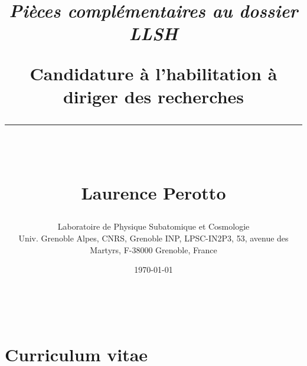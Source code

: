 \documentclass[a4paper, 11pt]{report}
\makeatletter
\renewcommand{\maketitle}{ %
\begin{flushleft} %
{\LARGE\@title} %

\vspace{50pt} %

{\large\@author} %
\\\@date %

\vspace{40pt} %
\end{flushleft}
}
\makeatother
\begin{document}
\title{\parbox{16cm}{
    \textit{Pi\`eces compl\'ementaires au dossier LLSH} \\ [5cm]   
    \begin{center}\sf\bfseries\huge
      Candidature \`a l'habilitation \`a diriger des recherches \\ [-4mm]
      \rule{16cm}{1pt}\\ [2cm]   
    \end{center}
    \begin{center} 
      \sf \bfseries {\textcolor{bleu}{Laurence Perotto}} \\ [6cm]     
    \end{center}
  }
}
\author{\parbox{16cm}{
    {\sf \Large Laboratoire de Physique Subatomique et Cosmologie} \\ [1cm]
    Univ. Grenoble Alpes, CNRS, Grenoble INP, LPSC-IN2P3, 53, avenue des Martyrs, F-38000 Grenoble, France
  }
}
\date{\today}

\maketitle %
%
%
%
\tableofcontents


%
%
\chapter{{\color[RGB]{30,144,255} Curriculum vitae}}%


%
%
\end{document}
